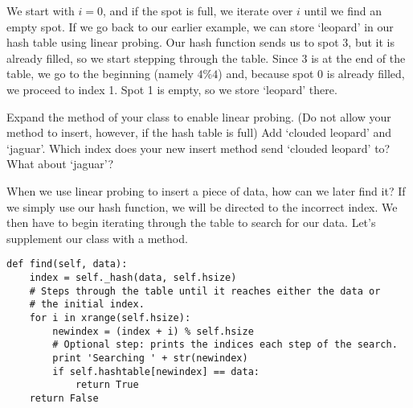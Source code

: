We start with $i = 0$, and if the spot is full, we iterate over $i$ until we find an empty spot.
If we go back to our earlier example, we can store `leopard' in our hash table using linear probing.
Our hash function sends us to spot 3, but it is already filled, so we start stepping through the table.
Since 3 is at the end of the table, we go to the beginning (namely $4 \% 4$) and, because spot 0 is already filled, we proceed to index 1.
Spot 1 is empty, so we store `leopard' there.
\begin{center}
\end{center}
\begin{problem}
Expand the  method of your  class to enable linear probing.
(Do not allow your method to insert, however, if the hash table is full)
Add `clouded leopard' and `jaguar'.
Which index does your new insert method send `clouded leopard' to?
What about `jaguar'?
\label{prob:Linear probing insert}
\end{problem}

When we use linear probing to insert a piece of data, how can we later find it?
If we simply use our hash function, we will be directed to the incorrect index.
We then have to begin iterating through the table to search for our data.
Let's supplement our  class with a  method.
\begin{lstlisting}
def find(self, data):
    index = self._hash(data, self.hsize)
    # Steps through the table until it reaches either the data or 
    # the initial index.
    for i in xrange(self.hsize):
        newindex = (index + i) % self.hsize
        # Optional step: prints the indices each step of the search.
        print 'Searching ' + str(newindex)
        if self.hashtable[newindex] == data:
            return True
    return False
\end{lstlisting}

